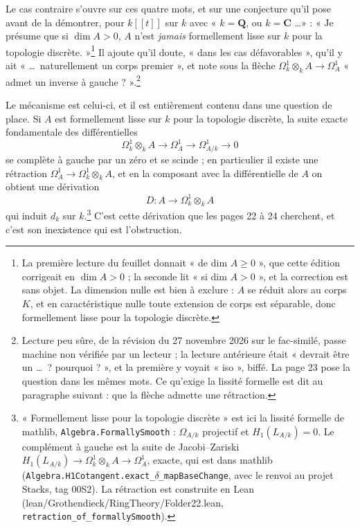 \documentclass[11pt,a4paper]{article}
\begin{document}
Le cas contraire s'ouvre sur ces quatre mots, et sur une conjecture qu'il pose
avant de la démontrer, pour $k[[t]]$ sur $k$ avec « $k = \mathbf{Q}$, ou
$k = \mathbf{C}$ \ldots » : « Je présume que si $\dim A > 0$, $A$ n'est
\emph{jamais} formellement lisse sur $k$ pour la topologie
discrète. »\footnote{La première lecture du feuillet donnait « de dim
$A \geqslant 0$ », que cette édition corrigeait en $\dim A > 0$ ; la seconde lit
« si dim $A > 0$ », et la correction est sans objet. La dimension nulle est
bien à exclure : $A$ se réduit alors au corps $K$, et en caractéristique nulle
toute extension de corps est séparable, donc formellement lisse pour la
topologie discrète.} Il ajoute qu'il doute, « dans les cas défavorables »,
qu'il y ait « \ldots\ naturellement un corps premier », et note sous la flèche
$\Omega^1_k \otimes_k A \to \Omega^1_A$ « admet un inverse à gauche ? ».\footnote{Lecture peu sûre, de la révision du 27 novembre 2026 sur le fac-similé,
passe machine non vérifiée par un lecteur ; la lecture antérieure
était « devrait être un \ldots\ ? pourquoi ? », et la première y voyait
« iso », biffé. La page 23 pose la question dans les mêmes mots. Ce qu'exige la lissité formelle est
dit au paragraphe suivant : que la flèche admette une rétraction.}

Le mécanisme est celui-ci, et il est entièrement contenu dans une question de
place. Si $A$ est formellement lisse sur $k$ pour la topologie discrète, la
suite exacte fondamentale des différentielles
\[
  \Omega^1_{k} \otimes_{k} A \longrightarrow \Omega^1_{A}
  \longrightarrow \Omega^1_{A/k} \longrightarrow 0
\]
se complète à gauche par un zéro et se scinde ; en particulier il existe une
rétraction $\Omega^1_A \to \Omega^1_k \otimes_k A$, et en la composant avec la
différentielle de $A$ on obtient une dérivation
\[
  D : A \longrightarrow \Omega^1_{k} \otimes_{k} A
\]
qui induit $d_{k}$ sur $k$.\footnote{« Formellement lisse pour la topologie
discrète » est ici la lissité formelle de mathlib,
\texttt{Algebra.FormallySmooth} : $\Omega_{A/k}$ projectif et
$H_1(L_{A/k}) = 0$. Le complément à gauche est la suite de Jacobi--Zariski
$H_1(L_{A/k}) \to \Omega^1_k \otimes_k A \to \Omega^1_A$, exacte, qui est dans
mathlib (\texttt{Algebra.H1Cotangent.exact\_}$\delta$\texttt{\_mapBaseChange}, avec le renvoi
au projet Stacks, tag 00S2). La rétraction est construite en Lean
(lean/Grothendieck/RingTheory/Folder22.lean, \texttt{retraction\_of\_formallySmooth}).}
C'est cette dérivation que les pages 22 à 24
cherchent, et c'est son inexistence qui est l'obstruction.
\end{document}
